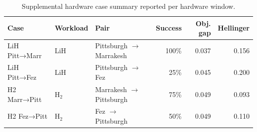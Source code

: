 \begin{table}[t]
\centering
{}
\begin{tabular}{lllrrr}
\toprule
Case & Workload & Pair & Success & Obj. gap & Hellinger \\
\midrule
LiH Pitt→Marr & LiH & Pittsburgh $\rightarrow$ Marrakesh & 100\% & 0.037 & 0.156 \\
LiH Pitt→Fez & LiH & Pittsburgh $\rightarrow$ Fez & 25\% & 0.045 & 0.200 \\
H2 Marr→Pitt & H$_2$ & Marrakesh $\rightarrow$ Pittsburgh & 75\% & 0.049 & 0.093 \\
H2 Fez→Pitt & H$_2$ & Fez $\rightarrow$ Pittsburgh & 50\% & 0.049 & 0.110 \\
\bottomrule
\end{tabular}
\caption{Supplemental hardware case summary reported per hardware window.}
\label{tab:supplemental\_hw\_case\_summary}
\end{table}
